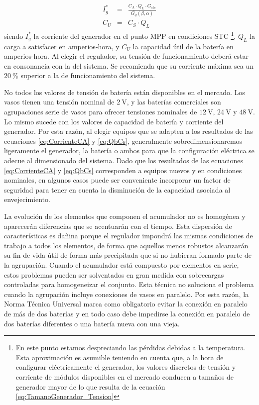 \begin{eqnarray}
I_{g}^{*} & = & \frac{C_{A}\cdot Q_{L}\cdot G_{stc}}{\overline{G_{d}}(\beta,\alpha)}\label{eq:CorrienteCA}\\
C_{U} & = & C_{S}\cdot Q_{L}\label{eq:QbCs}\end{eqnarray}
siendo
$I_{g}^{*}$ la corriente del generador en el punto MPP en condiciones
STC%
\footnote{En este punto estamos despreciando las pérdidas debidas a la temperatura.
Esta aproximación es asumible teniendo en cuenta que, a la hora de
configurar eléctricamente el generador, los valores discretos de tensión
y corriente de módulos disponibles en el mercado conducen a tamaños
de generador mayor de lo que resulta de la ecuación \ref{eq:TamanoGenerador_Tension}%
}, $Q_{L}$ la carga a satisfacer en amperios-hora, y $C_{U}$ la capacidad
útil de la batería en amperios-hora. Al elegir el regulador, su tensión
de funcionamiento deberá estar en consonancia con la del sistema.
Se recomienda que su corriente máxima sea un $\SI{20}{\percent}$
superior a la de funcionamiento del sistema.

No todos los valores de tensión de batería están disponibles en el
mercado. Los vasos tienen una tensión nominal de $\SI{2}{\volt}$,
y las baterías comerciales son agrupaciones serie de vasos para ofrecer
tensiones nominales de $\SI{12}{\volt}$, $\SI{24}{\volt}$ y $\SI{48}{\volt}$.
Lo mismo sucede con los valores de capacidad de batería y corriente
del generador. Por esta razón, al elegir equipos que se adapten a
los resultados de las ecuaciones \ref{eq:CorrienteCA} y \ref{eq:QbCs},
generalmente sobredimensionaremos ligeramente el generador, la batería
o ambos para que la configuración eléctrica se adecue al dimensionado
del sistema. Dado que los resultados de las ecuaciones \ref{eq:CorrienteCA}
y \ref{eq:QbCs} corresponden a equipos nuevos y en condiciones nominales,
en algunos casos puede ser conveniente incorporar un factor de seguridad
para tener en cuenta la disminución de la capacidad asociada al envejecimiento.

La evolución de los elementos que componen el acumulador no es homogénea
y aparecerán diferencias que se acentuarán con el tiempo. Esta dispersión
de características es dañina porque el regulador impondrá las mismas
condiciones de trabajo a todos los elementos, de forma que aquellos
menos robustos alcanzarán su fin de vida útil de forma más precipitada
que si no hubieran formado parte de la agrupación. Cuando el acumulador
está compuesto por elementos en serie, estos problemas pueden ser
solventados en gran medida con sobrecargas controladas para homogeneizar
el conjunto. Esta técnica no soluciona el problema cuando la agrupación
incluye conexiones de vasos en paralelo. Por esta razón, la Norma
Técnica Universal marca como obligatorio evitar la conexión en paralelo
de más de dos baterías y en todo caso debe impedirse la conexión en
paralelo de dos baterías diferentes o una batería nueva con una vieja.


